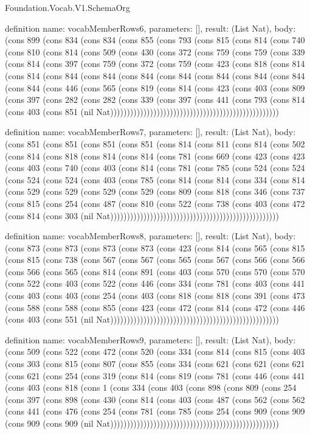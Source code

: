\begin{lexlean}{Foundation.Vocab.V1.SchemaOrg}
\begin{semanticmodule}
definition{
  name: vocabMemberRows6,
  parameters: [],
  result: (List Nat),
  body: (cons 899 (cons 834 (cons 834 (cons 855 (cons 793 (cons 815 (cons 814 (cons 740 (cons 810 (cons 814 (cons 509 (cons 430 (cons 372 (cons 759 (cons 759 (cons 339 (cons 814 (cons 397 (cons 759 (cons 372 (cons 759 (cons 423 (cons 818 (cons 814 (cons 814 (cons 844 (cons 844 (cons 844 (cons 844 (cons 844 (cons 844 (cons 844 (cons 844 (cons 446 (cons 565 (cons 819 (cons 814 (cons 423 (cons 403 (cons 809 (cons 397 (cons 282 (cons 282 (cons 339 (cons 397 (cons 441 (cons 793 (cons 814 (cons 403 (cons 851 (nil Nat)))))))))))))))))))))))))))))))))))))))))))))))))))
}

definition{
  name: vocabMemberRows7,
  parameters: [],
  result: (List Nat),
  body: (cons 851 (cons 851 (cons 851 (cons 851 (cons 814 (cons 811 (cons 814 (cons 502 (cons 814 (cons 818 (cons 814 (cons 814 (cons 781 (cons 669 (cons 423 (cons 423 (cons 403 (cons 740 (cons 403 (cons 814 (cons 781 (cons 785 (cons 524 (cons 524 (cons 524 (cons 524 (cons 403 (cons 785 (cons 814 (cons 814 (cons 334 (cons 814 (cons 529 (cons 529 (cons 529 (cons 529 (cons 809 (cons 818 (cons 346 (cons 737 (cons 815 (cons 254 (cons 487 (cons 810 (cons 522 (cons 738 (cons 403 (cons 472 (cons 814 (cons 303 (nil Nat)))))))))))))))))))))))))))))))))))))))))))))))))))
}

definition{
  name: vocabMemberRows8,
  parameters: [],
  result: (List Nat),
  body: (cons 873 (cons 873 (cons 873 (cons 873 (cons 423 (cons 814 (cons 565 (cons 815 (cons 815 (cons 738 (cons 567 (cons 567 (cons 565 (cons 567 (cons 566 (cons 566 (cons 566 (cons 565 (cons 814 (cons 891 (cons 403 (cons 570 (cons 570 (cons 570 (cons 522 (cons 403 (cons 522 (cons 446 (cons 334 (cons 781 (cons 403 (cons 441 (cons 403 (cons 403 (cons 254 (cons 403 (cons 818 (cons 818 (cons 391 (cons 473 (cons 588 (cons 588 (cons 855 (cons 423 (cons 472 (cons 814 (cons 472 (cons 446 (cons 403 (cons 551 (nil Nat)))))))))))))))))))))))))))))))))))))))))))))))))))
}

definition{
  name: vocabMemberRows9,
  parameters: [],
  result: (List Nat),
  body: (cons 509 (cons 522 (cons 472 (cons 520 (cons 334 (cons 814 (cons 815 (cons 403 (cons 303 (cons 815 (cons 807 (cons 855 (cons 334 (cons 621 (cons 621 (cons 621 (cons 621 (cons 254 (cons 319 (cons 814 (cons 819 (cons 781 (cons 446 (cons 441 (cons 403 (cons 818 (cons 1 (cons 334 (cons 403 (cons 898 (cons 809 (cons 254 (cons 397 (cons 898 (cons 430 (cons 814 (cons 403 (cons 487 (cons 562 (cons 562 (cons 441 (cons 476 (cons 254 (cons 781 (cons 785 (cons 254 (cons 909 (cons 909 (cons 909 (cons 909 (nil Nat)))))))))))))))))))))))))))))))))))))))))))))))))))
}


\end{semanticmodule}
\end{lexlean}
